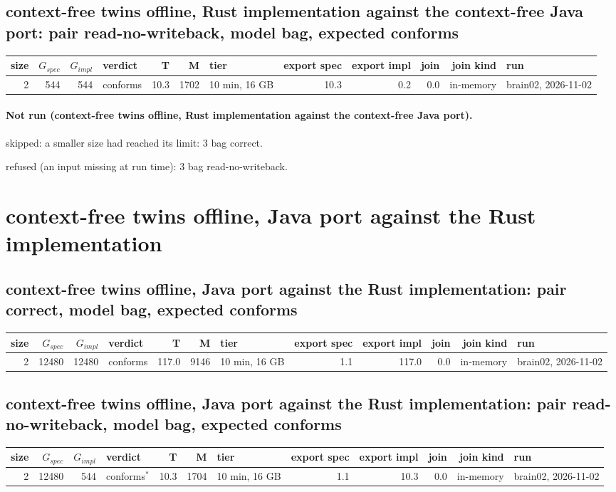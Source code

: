 \documentclass[10pt]{article}
\begin{document}
\subsection*{context-free twins offline, Rust implementation against the context-free Java port: pair \textsf{read-no-writeback}, model bag, expected conforms}
\begin{longtable}{@{}rrrlrrlrrrrl@{}}
\toprule
size & $G_{\mathit{spec}}$ & $G_{\mathit{impl}}$ & verdict & T & M & tier & export spec & export impl & join & join kind & run \\
\midrule
\endhead
\color{red} 2 & 544 & 544 & conforms & 10.3 & 1702 & 10 min, 16 GB & 10.3 & 0.2 & 0.0 & in-memory & brain02, 2026-11-02 \\
\bottomrule
\end{longtable}
\paragraph{Not run (context-free twins offline, Rust implementation against the context-free Java port).}
skipped: a smaller size had reached its limit: 3 bag correct.\par
refused (an input missing at run time): 3 bag read-no-writeback.\par
\section*{context-free twins offline, Java port against the Rust implementation}
\subsection*{context-free twins offline, Java port against the Rust implementation: pair \textsf{correct}, model bag, expected conforms}
\begin{longtable}{@{}rrrlrrlrrrrl@{}}
\toprule
size & $G_{\mathit{spec}}$ & $G_{\mathit{impl}}$ & verdict & T & M & tier & export spec & export impl & join & join kind & run \\
\midrule
\endhead
\color{red} 2 & 12480 & 12480 & conforms & 117.0 & 9146 & 10 min, 16 GB & 1.1 & 117.0 & 0.0 & in-memory & brain02, 2026-11-02 \\
\bottomrule
\end{longtable}
\subsection*{context-free twins offline, Java port against the Rust implementation: pair \textsf{read-no-writeback}, model bag, expected conforms}
\begin{longtable}{@{}rrrlrrlrrrrl@{}}
\toprule
size & $G_{\mathit{spec}}$ & $G_{\mathit{impl}}$ & verdict & T & M & tier & export spec & export impl & join & join kind & run \\
\midrule
\endhead
\color{red} 2 & 12480 & 544 & conforms$^{\ast}$ & 10.3 & 1704 & 10 min, 16 GB & 1.1 & 10.3 & 0.0 & in-memory & brain02, 2026-11-02 \\
\bottomrule
\end{longtable}
\end{document}
